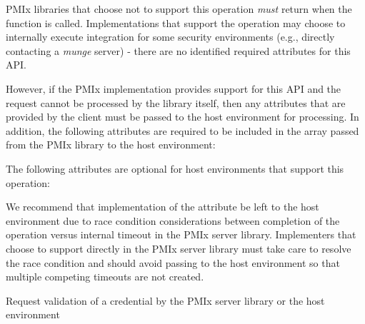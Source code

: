 \reqattrstart
\ac{PMIx} libraries that choose not to support this operation \textit{must} return  when the function is called. Implementations that support the operation may choose to internally execute integration for some security environments (e.g., directly contacting a \textit{munge} server) - there are no identified required attributes for this \ac{API}.

However, if the \ac{PMIx} implementation provides support for this \ac{API} and the request cannot be processed by the library itself, then any attributes that are provided by the client must be passed to the host environment for processing. In addition, the following attributes are required to be included in the  array passed from the \ac{PMIx} library to the host environment:


\reqattrend

\optattrstart
The following attributes are optional for host environments that support this operation:


\optattrend

\adviceimplstart
We recommend that implementation of the  attribute be left to the host environment due to race condition considerations between completion of the operation versus internal timeout in the \ac{PMIx} server library. Implementers that choose to support  directly in the \ac{PMIx} server library must take care to resolve the race condition and should avoid passing  to the host environment so that multiple competing timeouts are not created.
\adviceimplend


\descr

Request validation of a credential by the \ac{PMIx} server library or the host environment




